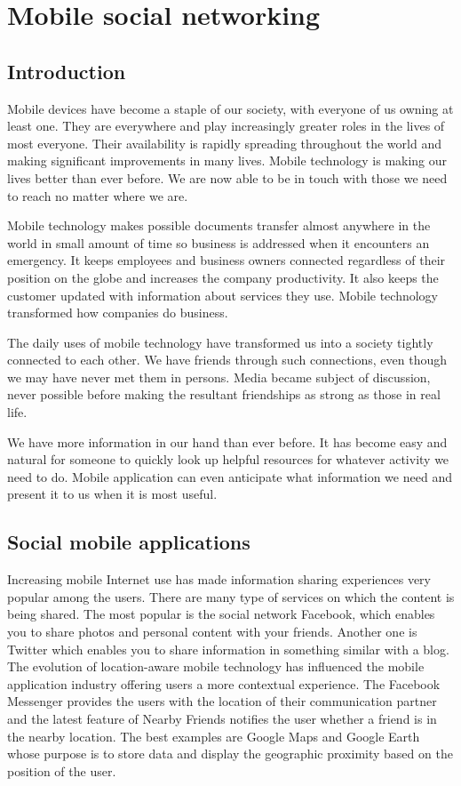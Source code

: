 \chapter{Mobile social networking}\label{chap1}


\section{Introduction}

Mobile devices have become a staple of our society, with everyone of
us owning at least one. They are everywhere and play increasingly greater roles
in the lives of most everyone. Their availability is rapidly spreading
throughout the world and making significant improvements in many lives. Mobile
technology is making our lives better than ever before. We are now able to be in
touch with those we need to reach no matter where we are.

Mobile technology makes possible documents transfer almost anywhere in
the world in small amount of time so business is addressed when it
encounters an emergency. It keeps employees and business owners connected
regardless of their position on the globe and increases the company
productivity. It also keeps the customer updated with information about services
they use. Mobile technology transformed how companies do business.

The daily uses of mobile technology have transformed us into a society tightly
connected to each other. We have friends through such connections, even though
we may have never met them in persons. Media became subject of discussion, never
possible before making the resultant friendships as strong as those in real
life.

 
We have more information in our hand than ever before. It has become easy and
natural for someone to quickly look up helpful resources for whatever activity
we need to do. Mobile application can even anticipate what information we need
and present it to us when it is most useful.


\section{Social mobile applications}

Increasing mobile Internet use has made information sharing experiences very
popular among the users. There are many type of services on which the content is
being shared. The most popular is the social network Facebook, which enables you
to share photos and personal content with your friends. Another one is Twitter
which enables you to share information in something similar with a blog.
The evolution of location-aware mobile technology has influenced the mobile
application industry offering users a more contextual experience. The Facebook
Messenger provides the users with the location of their communication partner
and the latest feature of Nearby Friends notifies the user whether a friend is
in the nearby location. The best examples are Google Maps and Google Earth whose
purpose is to store data and display the geographic proximity based on the
position of the user.

